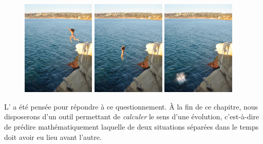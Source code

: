 		\begin{figure}
			\begin{center}
				\includegraphics[width=0.31\textwidth]{images/water_jump_1.jpg}
				\includegraphics[width=0.31\textwidth]{images/water_jump_2.jpg}
				\includegraphics[width=0.31\textwidth]{images/water_jump_3.jpg}
			\end{center}
			\label{fig_water_jump}
		\end{figure}
	
		L’ a été pensée pour répondre à ce questionnement. À la fin de ce chapitre, nous disposerons d’un outil permettant de \emph{calculer} le sens d’une évolution, c’est-à-dire de prédire mathématiquement laquelle de deux situations séparées dans le temps doit avoir eu lieu avant l’autre.

